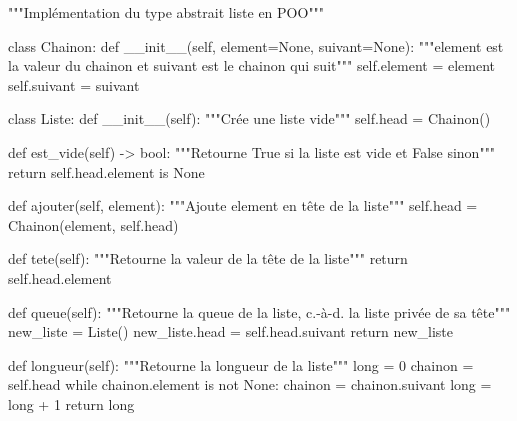 \documentclass[
  a4paper,
  DIV=11,
  numbers=noendperiod]{scrartcl}
\newenvironment{Shaded}{\begin{snugshade}}{\end{snugshade}}
\newcommand{\BuiltInTok}[1]{\textcolor[rgb]{0.00,0.23,0.31}{#1}}
\newcommand{\CommentTok}[1]{\textcolor[rgb]{0.37,0.37,0.37}{#1}}
\newcommand{\ControlFlowTok}[1]{\textcolor[rgb]{0.00,0.23,0.31}{#1}}
\newcommand{\DecValTok}[1]{\textcolor[rgb]{0.68,0.00,0.00}{#1}}
\newcommand{\FunctionTok}[1]{\textcolor[rgb]{0.28,0.35,0.67}{#1}}
\newcommand{\KeywordTok}[1]{\textcolor[rgb]{0.00,0.23,0.31}{#1}}
\newcommand{\NormalTok}[1]{\textcolor[rgb]{0.00,0.23,0.31}{#1}}
\newcommand{\OperatorTok}[1]{\textcolor[rgb]{0.37,0.37,0.37}{#1}}
\newcommand{\VariableTok}[1]{\textcolor[rgb]{0.07,0.07,0.07}{#1}}
\begin{document}
\begin{Shaded}
\begin{Highlighting}[]
\CommentTok{"""Implémentation du type abstrait liste en POO"""}


\KeywordTok{class}\NormalTok{ Chainon:}
    \KeywordTok{def} \FunctionTok{\_\_init\_\_}\NormalTok{(}\VariableTok{self}\NormalTok{, element}\OperatorTok{=}\VariableTok{None}\NormalTok{, suivant}\OperatorTok{=}\VariableTok{None}\NormalTok{):}
        \CommentTok{"""element est la valeur du chainon et suivant est le chainon qui suit"""}
        \VariableTok{self}\NormalTok{.element }\OperatorTok{=}\NormalTok{ element}
        \VariableTok{self}\NormalTok{.suivant }\OperatorTok{=}\NormalTok{ suivant}


\KeywordTok{class}\NormalTok{ Liste:}
    \KeywordTok{def} \FunctionTok{\_\_init\_\_}\NormalTok{(}\VariableTok{self}\NormalTok{):}
        \CommentTok{"""Crée une liste vide"""}
        \VariableTok{self}\NormalTok{.head }\OperatorTok{=}\NormalTok{ Chainon()}

    \KeywordTok{def}\NormalTok{ est\_vide(}\VariableTok{self}\NormalTok{) }\OperatorTok{{-}\textgreater{}} \BuiltInTok{bool}\NormalTok{:}
        \CommentTok{"""Retourne True si la liste est vide et False sinon"""}
        \ControlFlowTok{return} \VariableTok{self}\NormalTok{.head.element }\KeywordTok{is} \VariableTok{None}

    \KeywordTok{def}\NormalTok{ ajouter(}\VariableTok{self}\NormalTok{, element):}
        \CommentTok{"""Ajoute element en tête de la liste"""}
        \VariableTok{self}\NormalTok{.head }\OperatorTok{=}\NormalTok{ Chainon(element, }\VariableTok{self}\NormalTok{.head)}

    \KeywordTok{def}\NormalTok{ tete(}\VariableTok{self}\NormalTok{):}
        \CommentTok{"""Retourne la valeur de la tête de la liste"""}
        \ControlFlowTok{return} \VariableTok{self}\NormalTok{.head.element}

    \KeywordTok{def}\NormalTok{ queue(}\VariableTok{self}\NormalTok{):}
        \CommentTok{"""Retourne la queue de la liste, c.{-}à{-}d. la liste privée de sa tête"""}
\NormalTok{        new\_liste }\OperatorTok{=}\NormalTok{ Liste()}
\NormalTok{        new\_liste.head }\OperatorTok{=} \VariableTok{self}\NormalTok{.head.suivant}
        \ControlFlowTok{return}\NormalTok{ new\_liste}

    \KeywordTok{def}\NormalTok{ longueur(}\VariableTok{self}\NormalTok{):}
        \CommentTok{"""Retourne la longueur de la liste"""}
        \BuiltInTok{long} \OperatorTok{=} \DecValTok{0}
\NormalTok{        chainon }\OperatorTok{=} \VariableTok{self}\NormalTok{.head}
        \ControlFlowTok{while}\NormalTok{ chainon.element }\KeywordTok{is} \KeywordTok{not} \VariableTok{None}\NormalTok{:}
\NormalTok{            chainon }\OperatorTok{=}\NormalTok{ chainon.suivant}
            \BuiltInTok{long} \OperatorTok{=} \BuiltInTok{long} \OperatorTok{+} \DecValTok{1}
        \ControlFlowTok{return} \BuiltInTok{long}
\end{Highlighting}
\end{Shaded}
\end{document}
